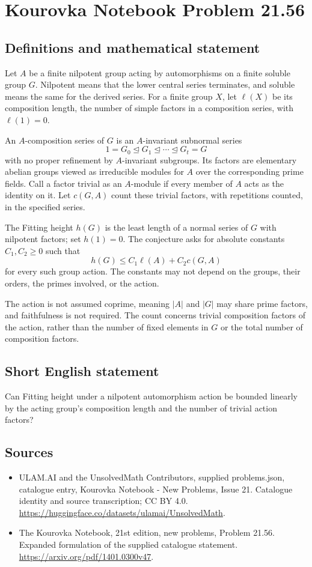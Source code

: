 \documentclass[11pt,a4paper]{article}
\begin{document}
\section*{Kourovka Notebook Problem 21.56}\label{statement}

\subsection{Definitions and mathematical statement}
Let $A$ be a finite nilpotent group acting by automorphisms on a finite
soluble group $G$. Nilpotent means that the lower central series
terminates, and soluble means the same for the derived series.
For a finite group $X$, let $\ell(X)$ be its composition length, the
number of simple factors in a composition series, with $\ell(1)=0$.

An $A$-composition series of $G$ is an $A$-invariant subnormal series
\[
 1=G_0\trianglelefteq G_1\trianglelefteq\cdots
                          \trianglelefteq G_t=G
\]
with no proper refinement by $A$-invariant subgroups.
Its factors are elementary abelian groups viewed as irreducible modules
for $A$ over the corresponding prime fields. Call a factor trivial
as an $A$-module if every member of $A$ acts as the identity on it.
Let $c(G,A)$ count these trivial factors, with repetitions counted,
in the specified series.

The Fitting height $h(G)$ is the least length of a normal series of
$G$ with nilpotent factors; set $h(1)=0$.
The conjecture asks for absolute constants $C_1,C_2\ge0$ such that
\[
 h(G)\le C_1\ell(A)+C_2c(G,A)
\]
for every such group action. The constants may not depend on the groups,
their orders, the primes involved, or the action.

The action is not assumed coprime, meaning $|A|$ and $|G|$ may share
prime factors, and faithfulness is not required. The count concerns
trivial composition factors of the action, rather than the number of
fixed elements in $G$ or the total number of composition factors.
\subsection{Short English statement}
Can Fitting height under a nilpotent automorphism action be bounded linearly by the acting group’s composition length and the number of trivial action factors?
\subsection{Sources}
\begin{itemize}
\item[S1] ULAM.AI and the UnsolvedMath Contributors, supplied problems.json, catalogue entry, Kourovka Notebook - New Problems, Issue 21. Catalogue identity and source transcription; CC BY 4.0.
\url{https://huggingface.co/datasets/ulamai/UnsolvedMath}.
\item[S2] The Kourovka Notebook, 21st edition, new problems, Problem 21.56. Expanded formulation of the supplied catalogue statement.
\url{https://arxiv.org/pdf/1401.0300v47}.
\end{itemize}
\end{document}
